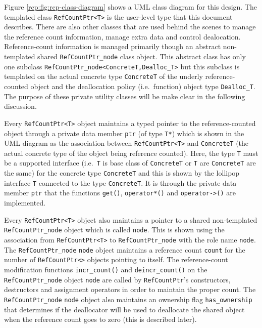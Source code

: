 Figure {}\ref{rcp:fig:rcp-class-diagram} shows a UML
{}\cite{ref:uml_distilled_2nd_ed} class diagram for this design.  The
templated class {}\texttt{Ref\-Count\-Ptr<T>} is the user-level type
that this document describes.  There are also other classes that are
used behind the scenes to manage the reference count information,
manage extra data and control dealocation.  Reference-count
information is managed primarily though an abstract non-templated
shared {}\texttt{Ref\-Count\-Ptr\-\_node} class object.  This abstract
class has only one subclass
{}\texttt{Ref\-Count\-Ptr\-\_node<\-ConcreteT\-,Dealloc\_T>} but this
subclass is templated on the actual concrete type {}\texttt{ConcreteT}
of the underly reference-counted object and the deallocation policy
(i.e.~function) object type {}\texttt{Dealloc\_T}.  The purpose of
these private utility classes will be make clear in the following
discussion.

Every {}\texttt{Ref\-Count\-Ptr<T>} object maintains a typed pointer
to the reference-counted object through a private data member
{}\texttt{ptr} (of type {}\texttt{T*}) which is shown in the UML
diagram as the association between {}\texttt{Ref\-Count\-Ptr<T>} and
{}\texttt{ConcreteT} (the actual concrete type of the object being
reference counted).  Here, the type {}\texttt{T} must be a supported
interface (i.e.~{}\texttt{T} is base class of {}\texttt{ConcreteT} or
{}\texttt{T} are {}\texttt{ConcreteT} are the same) for the concrete
type {}\texttt{ConcreteT} and this is shown by the lollipop interface
{}\texttt{T} connected to the type {}\texttt{ConcreteT}.  It is
through the private data member {}\texttt{ptr} that the functions
{}\texttt{get()}, {}\texttt{operator*()} and {}\texttt{operator->()}
are implemented.

Every {}\texttt{Ref\-Count\-Ptr<T>} object also maintains a pointer to
a shared non-templated {}\texttt{Ref\-Count\-Ptr\-\_node} object which
is called {}\texttt{node}.  This is shown using the association from
{}\texttt{Ref\-Count\-Ptr<T>} to {}\texttt{Ref\-Count\-Ptr\-\_node}
with the role name {}\texttt{node}.  The
{}\texttt{Ref\-Count\-Ptr\-\_node} {}\texttt{node} object maintains a
reference count {}\texttt{count} for the number of
{}\texttt{Ref\-Count\-Ptr<>} objects pointing to itself.  The
reference-count modification functions {}\texttt{incr\_count()} and
{}\texttt{deincr\_count()} on the {}\texttt{Ref\-Count\-Ptr\-\_node}
object {}\texttt{node} are called by {}\texttt{Ref\-Count\-Ptr}'s
constructors, destructors and assignment operators in order to
maintain the proper count.  The {}\texttt{Ref\-Count\-Ptr\-\_node}
{}\texttt{node} object also maintains an ownership flag
{}\texttt{has\-\_ownership} that determines if the deallocator will be
used to deallocate the shared object when the reference count goes to
zero (this is described later).

